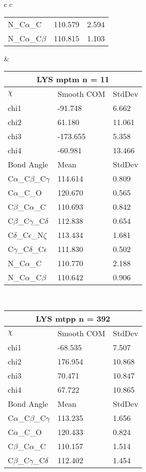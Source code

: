\begin{longtable}{ c c }
\begin{tabular}{ l l l }
  N\_C$\alpha$\_C & 110.579 & 2.594\\
  N\_C$\alpha$\_C$\beta$ & 110.815 & 1.103\\
  \bottomrule
  \end{tabular}
  &
  \begin{tabular}{ l l l }
  \toprule
  \multicolumn{3}{c}{LYS \textbf{mptm} n = 11} \\ \toprule
  $\chi$       & Smooth COM & StdDev \\ \midrule
  chi1 & -91.748 & 6.662 \\ 
  chi2 & 61.180 & 11.061 \\ 
  chi3 & -173.655 & 5.358 \\ 
  chi4 & -60.981 & 13.466 \\ \midrule
  Bond Angle   & Mean     & StdDev \\ \midrule
  C$\alpha$\_C$\beta$\_C$\gamma$ & 114.614 & 0.809\\
  C$\alpha$\_C\_O & 120.670 & 0.565\\
  C$\beta$\_C$\alpha$\_C & 110.693 & 0.842\\
  C$\beta$\_C$\gamma$\_C$\delta$ & 112.838 & 0.654\\
  C$\delta$\_C$\epsilon$\_N$\zeta$ & 113.434 & 1.681\\
  C$\gamma$\_C$\delta$\_C$\epsilon$ & 111.830 & 0.502\\
  N\_C$\alpha$\_C & 110.770 & 2.188\\
  N\_C$\alpha$\_C$\beta$ & 110.642 & 0.906\\
  \bottomrule
  \end{tabular}
  \\
  \begin{tabular}{ l l l }
  \toprule
  \multicolumn{3}{c}{LYS \textbf{mtpp} n = 392} \\ \toprule
  $\chi$       & Smooth COM & StdDev \\ \midrule
  chi1 & -68.535 & 7.507 \\ 
  chi2 & 176.954 & 10.868 \\ 
  chi3 & 70.471 & 10.847 \\ 
  chi4 & 67.722 & 10.865 \\ \midrule
  Bond Angle   & Mean     & StdDev \\ \midrule
  C$\alpha$\_C$\beta$\_C$\gamma$ & 113.235 & 1.656\\
  C$\alpha$\_C\_O & 120.433 & 0.824\\
  C$\beta$\_C$\alpha$\_C & 110.157 & 1.514\\
  C$\beta$\_C$\gamma$\_C$\delta$ & 112.402 & 1.454\\

\end{tabular}
\end{longtable}

